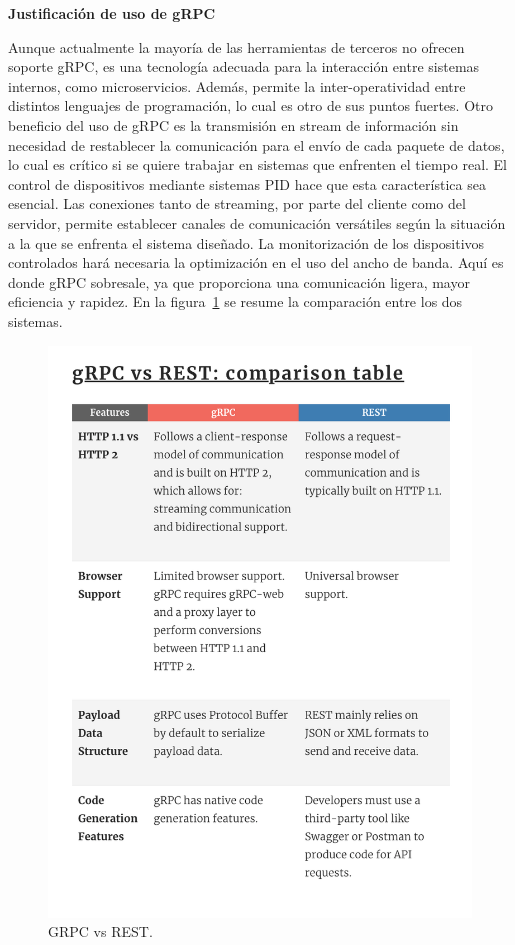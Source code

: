 \textbf{Justificación de uso de gRPC}

Aunque actualmente la mayoría de las herramientas de terceros no ofrecen soporte gRPC, es una tecnología adecuada para la interacción entre sistemas internos, como microservicios.
Además, permite la inter-operatividad entre distintos lenguajes de programación, lo cual es otro de sus puntos fuertes.
Otro beneficio del uso de gRPC es la transmisión en stream de información sin necesidad de restablecer la comunicación para el envío de cada paquete de datos, lo cual es crítico si se quiere trabajar en sistemas que enfrenten el tiempo real.
El control de dispositivos mediante sistemas PID hace que esta característica sea esencial.
Las conexiones tanto de streaming, por parte del cliente como del servidor, permite establecer canales de comunicación versátiles según la situación a la que se enfrenta el sistema diseñado.
La monitorización de los dispositivos controlados hará necesaria la optimización en el uso del ancho de banda.
Aquí es donde gRPC sobresale, ya que proporciona una comunicación ligera, mayor eficiencia y rapidez.
En la figura~\cref{fig:gRPC vs REST} se resume la comparación entre los dos sistemas.

\begin{figure}[H]
    \centering
    \includegraphics[height=0.4\textheight]{./part/Proyecto_ejecutivo/memoria_constructiva/rpc/img/rpcComparison}
    \caption{GRPC vs REST.\cite{berga_santos_2023}}\label{fig:gRPC vs REST}
\end{figure}